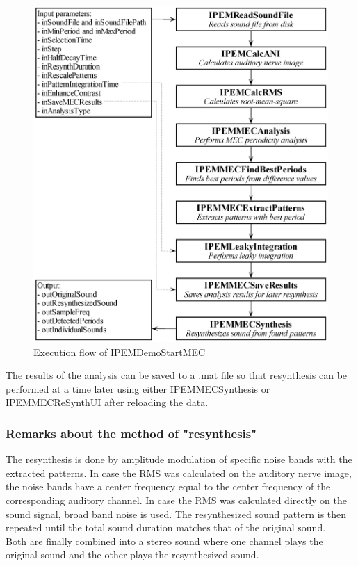 \begin{figure}[h]
    \centering
    \includegraphics[width=\IPEMDefaultFigureWidth]{Graphics/IPEMDemoStartMEC}
    \caption{Execution flow of IPEMDemoStartMEC}
    \label{Fig:IPEMDemoStartMEC}
\end{figure}

The results of the analysis can be saved to a .mat file so that
resynthesis can be performed at a time later using either
\hyperlink{FuncRef:IPEMMECSynthesis}{IPEMMECSynthesis} or
\hyperlink{FuncRef:IPEMMECReSynthUI}{IPEMMECReSynthUI} after
reloading the data.


\subsubsection*{Remarks about the method of "resynthesis"}

The resynthesis is done by amplitude modulation of specific noise
bands with the extracted patterns. In case the RMS was calculated
on the auditory nerve image, the noise bands have a center
frequency equal to the center frequency of the corresponding
auditory channel. In case the RMS was calculated directly on the
sound signal, broad band noise is used. The resynthesized sound
pattern is then repeated until the total sound duration matches
that of the original sound.\\
Both are finally combined into a stereo sound where one channel
plays the original sound and the other plays the resynthesized sound.\\


